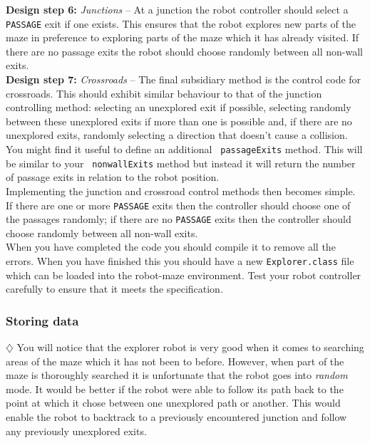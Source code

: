 \noindent 
{\bf Design step 6:} {\it Junctions} -- At a junction
the robot controller should select a {\tt PASSAGE} exit if one
exists. This ensures that the robot explores new parts of the
maze in preference to exploring parts of the maze which it has
already visited. If there are no passage exits the robot should
choose randomly between all non-wall exits. \\

\noindent 
{\bf Design step 7:} {\it Crossroads} -- The final
subsidiary method is the control code for crossroads. This should
exhibit similar behaviour to that of the junction controlling
method: selecting an unexplored exit if possible, selecting
randomly between these unexplored exits if more than one is
possible and, if there are no unexplored exits, randomly
selecting a direction that doesn't cause a collision. \\

\noindent
You might find it useful to define an additional {\tt
passageExits} method. This will be similar to your {\tt
nonwallExits} method but instead it will return the number of
passage exits in relation to the robot position.\\

\noindent
Implementing the junction and crossroad control methods then
becomes simple. If there are one or more {\tt PASSAGE} exits then
the controller should choose one of the passages randomly; if
there are no {\tt PASSAGE} exits then the controller should choose
randomly between all non-wall exits. \\

\noindent
When you have completed the code you should compile it to remove all the
errors. When you have finished this you should have a new {\tt Explorer.class}
file which can be loaded into the robot-maze environment.
Test your robot controller carefully to ensure that it meets the specification.\\


\subsubsection{Storing data}

$\diamondsuit$
You will notice that the explorer robot is very good when it comes to searching
areas of the maze which it has not been to before. However, when part of the
maze is thoroughly searched it is unfortunate that the robot goes into {\it random}
mode. It would be better if the robot were able to follow its path back to the
point at which it chose between one unexplored path or another. This
would enable the robot to backtrack to a previously encountered junction and
follow any previously unexplored exits. \\


